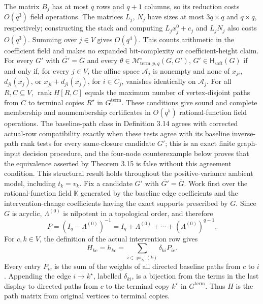 The matrix \(B_j\) has at most \(q\) rows and \(q+1\) columns, so its reduction costs \(O(q^3)\) field operations.  The matrices \(L_j\), \(N_j\) have sizes at most \(3q\times q\) and \(q\times q\), respectively; constructing the stack and computing \(L_jx_j^0+c_j\) and \(L_jN_j\) also costs \(O(q^3)\).  Summing over \(j\in V\) gives \(O(q^4)\).  This counts arithmetic in the coefficient field and makes no expanded bit-complexity or coefficient-height claim.
For every \(G'\) with \(\overline{G'}=\overline G\) and every \(\theta\in\mathcal M^{\circ}_{\mathrm{term},p,q}(G,G')\), \(G'\in\mathsf H_{\mathrm{soft}}(G)\) if and only if, for every \(j\in V\), the affine space \(\mathcal A_j\) is nonempty and none of \(x_{ji}\), \(d_{ji}(x_j)\), or \(x_{ji}+d_{ji}(x_j)\), for \(i\in C_j\), vanishes identically on \(\mathcal A_j\). For all \(R,C\subseteq V\), \(\operatorname{rank}H[R,C]\) equals the maximum number of vertex-disjoint paths from \(C\) to terminal copies \(R^{\star}\) in \(G^{\mathrm{term}}\). These conditions give sound and complete membership and nonmembership certificates in \(O(q^5)\) rational-function field operations. The baseline-path class in Definition 3.14 agrees with corrected actual-row compatibility exactly when these tests agree with its baseline inverse-path rank tests for every same-closure candidate \(G'\); this is an exact finite graph-input decision procedure, and the four-node counterexample below proves that the equivalence asserted by Theorem 3.15 is false without this agreement condition. This structural result holds throughout the positive-variance ambient model, including \(t_k=v_k\).
Fix a candidate \(G'\) with \(\overline{G'}=\overline G\).  Work first over the rational-function field \(\mathbb K\) generated by the baseline edge coefficients and the intervention-change coefficients having the exact supports prescribed by \(G\).  Since \(G\) is acyclic, \(\Lambda^{(0)}\) is nilpotent in a topological order, and therefore
\[
 P=(I_q-\Lambda^{(0)})^{-1}
   =I_q+\Lambda^{(0)}+\cdots+(\Lambda^{(0)})^{q-1}.
\]
For \(c,k\in V\), the definition of the actual intervention row gives
\[
 H_{kc}=h_{kc}
 =\sum_{i\in\operatorname{pa}_{G}(k)}\delta_{ki}P_{ic}.
\]
Every entry \(P_{ic}\) is the sum of the weights of all directed baseline paths from \(c\) to \(i\).  Appending the edge \(i\to k^\star\), labelled \(\delta_{ki}\), is a bijection from the terms in the last display to directed paths from \(c\) to the terminal copy \(k^\star\) in \(G^{\mathrm{term}}\).  Thus \(H\) is the path matrix from original vertices to terminal copies.

